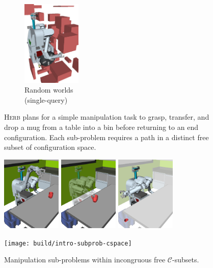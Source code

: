 {\begin{figure}[t]
\begin{widepage}
\begin{center}
   \quad%
   \begin{subfigure}[t]{1.1in}
      \centering
      \includegraphics[height=1.6in]{figs/herb-random-world.jpg}
      \caption{Random worlds\\
         (single-query)}
   \end{subfigure}

   \caption{\textsc{Herb} plans for a simple manipulation task
      to grasp, transfer, and drop a mug from a table into a bin
      before returning to an end configuration.
      Each sub-problem requires a path in a distinct free subset of
      configuration space.}
   \label{fig:intro-multi-part}
\end{center}
\end{widepage}
\end{figure}
}

\begin{figure}[t]
   \centering
   \includegraphics[height=1.4in]{figs/testherb-b.png}%
   \quad%
   \includegraphics[height=1.4in]{figs/testherb-c.png}%
   \quad%
   \includegraphics[height=1.4in]{figs/testherb-d.png}
   
   \texttt{[image: build/intro-subprob-cspace]}
   \caption{Manipulation sub-problems
      within incongruous free $\mathcal{C}$-subsets.}
\end{figure}

